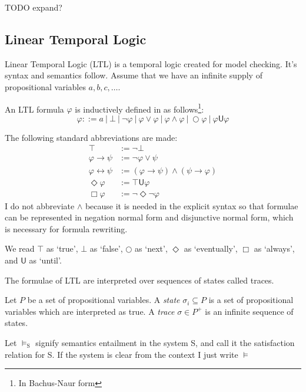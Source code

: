 \documentclass[a4paper]{article}
\newcommand{\U}{\mathsf{U}}
\begin{document}
TODO expand?

\subsection{Linear Temporal Logic}
Linear Temporal Logic (LTL)\autocite{pnueli1977temporal} is a temporal logic created for model checking. It's syntax and semantics follow. Assume that we have an infinite supply of propositional variables $a,b,c,\dots$.
\begin{defn}

  An LTL formula $\varphi$ is inductively defined in as follows\footnote{In Bachus-Naur form}:
  \[\varphi ::= a ~|~ \bot ~|~ \neg \varphi ~|~\varphi \lor \varphi ~|~ \varphi \land \varphi ~|~ \bigcirc \varphi ~|~ \varphi \U\varphi\]
\end{defn}
\begin{notn}\label{ltlabbrev}

  The following standard abbreviations are made:
  \begin{align*}
    \top &:= \neg \bot\\
    \varphi \to \psi &:= \neg \varphi \lor \psi\\
    \varphi \leftrightarrow \psi &:= (\varphi \to \psi) \land (\psi \to \varphi)\\
    \Diamond \varphi &:= \top \U{} \varphi\\
    \Box \varphi &:= \neg\Diamond\neg\varphi
  \end{align*}
  I do not abbreviate $\land$ because it is needed in the explicit syntax so that formulae can be represented in negation normal form and disjunctive normal form, which is necessary for formula rewriting.
\end{notn}

We read $\top$ as `true', $\bot$ as `false', $\bigcirc$ as `next', $\Diamond$ as `eventually', $\Box$ as `always', and $\U$ as `until'.

The formulae of LTL are interpreted over sequences of states called traces.

\begin{defn}

  Let $P$ be a set of propositional variables. A \emph{state} $\sigma_i \subseteq P$ is a set of propositional variables which are interpreted as true. A \emph{trace} $\sigma \in P^+$ is an infinite sequence of states.
\end{defn}

\begin{notn}

  Let $\vDash_{\text{S}}$ signify semantics entailment in the system S, and call it the satisfaction relation for S. If the system is clear from the context I just write $\vDash$

\end{notn}
\end{document}

